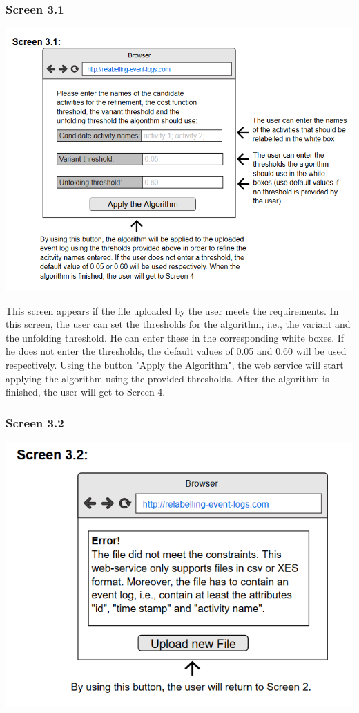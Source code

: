 \documentclass[notitlepage]{article}
\begin{document}
\begin{flushleft}
\subsubsection{Screen 3.1}
\includegraphics[scale=0.9]{InterfaceMockup3-1.png}

This screen appears if the file uploaded by the user meets the requirements. In this screen, the user can set the thresholds for the algorithm, i.e., the variant and the unfolding threshold. He can enter these in the corresponding white boxes. If he does not enter the thresholds, the default values of 0.05 and 0.60 will be used respectively. Using the button "Apply the Algorithm", the web service will start applying the algorithm using the provided thresholds. After the algorithm is finished, the user will get to Screen 4.

\subsubsection{Screen 3.2}
\includegraphics[scale=0.9]{InterfaceMockup3-2.png}


\end{flushleft}
\end{document}
